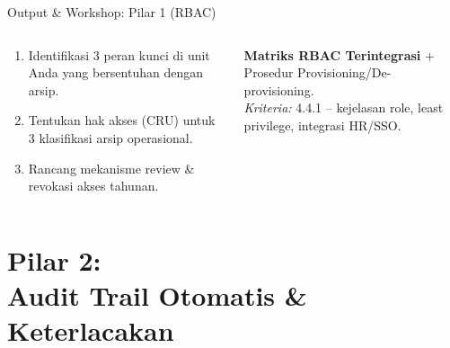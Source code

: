 \documentclass[aspectratio=169,11pt]{beamer}
\begin{document}
\begin{frame}{Output \& Workshop: Pilar 1 (RBAC)}
    \vspace{0.2cm}
    \begin{columns}[T]
        \begin{premiumbox}
            \scriptsize
            \begin{enumerate}
                \item Identifikasi 3 peran kunci di unit Anda yang bersentuhan dengan arsip.
                \item Tentukan hak akses (CRU) untuk 3 klasifikasi arsip operasional.
                \item Rancang mekanisme review \& revokasi akses tahunan.
            \end{enumerate}
        \end{premiumbox}
        
        \begin{greenbox}[Portofolio 1]
            \scriptsize
            \textbf{Matriks RBAC Terintegrasi} + Prosedur Provisioning/De-provisioning.\\[0.1cm]
            \textit{Kriteria:} 4.4.1 -- kejelasan role, least privilege, integrasi HR/SSO.
        \end{greenbox}
    \end{columns}
\end{frame}


\section{Pilar 2:\\Audit Trail Otomatis \& Keterlacakan}
\end{document}
